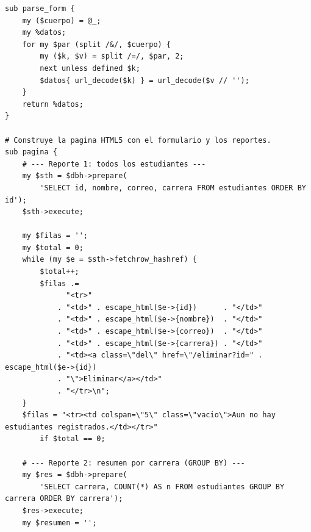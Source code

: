 \documentclass[11pt]{article}
\begin{document}
\begin{cajacodigo}
\begin{lstlisting}[style=perl]
sub parse_form {
    my ($cuerpo) = @_;
    my %datos;
    for my $par (split /&/, $cuerpo) {
        my ($k, $v) = split /=/, $par, 2;
        next unless defined $k;
        $datos{ url_decode($k) } = url_decode($v // '');
    }
    return %datos;
}

# Construye la pagina HTML5 con el formulario y los reportes.
sub pagina {
    # --- Reporte 1: todos los estudiantes ---
    my $sth = $dbh->prepare(
        'SELECT id, nombre, correo, carrera FROM estudiantes ORDER BY id');
    $sth->execute;

    my $filas = '';
    my $total = 0;
    while (my $e = $sth->fetchrow_hashref) {
        $total++;
        $filas .=
              "<tr>"
            . "<td>" . escape_html($e->{id})      . "</td>"
            . "<td>" . escape_html($e->{nombre})  . "</td>"
            . "<td>" . escape_html($e->{correo})  . "</td>"
            . "<td>" . escape_html($e->{carrera}) . "</td>"
            . "<td><a class=\"del\" href=\"/eliminar?id=" . escape_html($e->{id})
            . "\">Eliminar</a></td>"
            . "</tr>\n";
    }
    $filas = "<tr><td colspan=\"5\" class=\"vacio\">Aun no hay estudiantes registrados.</td></tr>"
        if $total == 0;

    # --- Reporte 2: resumen por carrera (GROUP BY) ---
    my $res = $dbh->prepare(
        'SELECT carrera, COUNT(*) AS n FROM estudiantes GROUP BY carrera ORDER BY carrera');
    $res->execute;
    my $resumen = '';
\end{lstlisting}
\end{cajacodigo}
\vspace{2pt}
\end{document}

